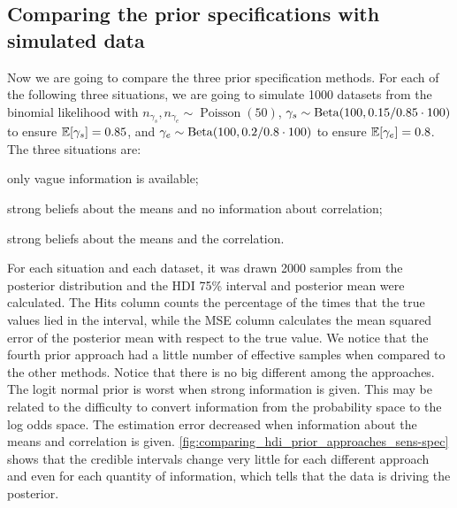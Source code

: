 \subsection{Comparing the prior specifications with simulated data}

Now we are going to compare the three prior specification methods. For each of
the following three situations, we are going to simulate 1000 datasets from
the binomial likelihood with $n_{\gamma_s}, n_{\gamma_e} \sim
  \operatorname{Poisson}(50)$, $\gamma_s \sim \operatorname{Beta}(100, 0.15/0.85 \cdot
  100)$ to ensure $\mathbb{E}[\gamma_s] = 0.85$, and  $\gamma_e \sim \operatorname{Beta}(100, 0.2/0.8 \cdot
  100)$ to ensure $\mathbb{E}[\gamma_e] = 0.8$. The three situations are:

\begin{alineas}
  \item \label{item:vague-information-sensitivity-specificity} only vague information is available;
  \item \label{item:strong-mean-sensitivity-specificity} strong beliefs about the means and no information about correlation;
  \item\label{item:strong-mean-cor-information-sensitivity-specificity}  strong beliefs about the means and the correlation.
\end{alineas}

For each situation and each dataset, it was drawn 2000 samples from the
posterior distribution and the HDI 75\% interval and posterior mean were calculated. The Hits
column counts the percentage of the times that the true values lied in the
interval, while the MSE column calculates the mean squared error of the
posterior mean with respect to the true value. We notice that the fourth prior
approach had a little number of effective samples when compared to the other
methods.  Notice that there is no big different among the approaches. The
logit normal prior is worst when strong information is given. This may be
related to the difficulty to convert information from the probability space to
the log odds space. The estimation error decreased when information about the
means and correlation is given.
\autoref{fig:comparing_hdi_prior_approaches_sens-spec}
shows that the credible intervals change very little for each different
approach and even for each quantity of information, which tells that the data
is driving the posterior.

